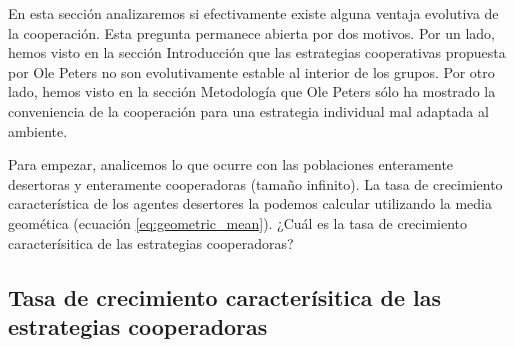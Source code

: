 \documentclass[a4paper,10pt]{article}
\begin{document}
En esta sección analizaremos si efectivamente existe alguna ventaja evolutiva de la cooperación.
Esta pregunta permanece abierta por dos motivos.
Por un lado, hemos visto en la sección Introducción que las estrategias cooperativas propuesta por Ole Peters no son evolutivamente estable al interior de los grupos.
Por otro lado, hemos visto en la sección Metodología que Ole Peters sólo ha mostrado la conveniencia de la cooperación para una estrategia individual mal adaptada al ambiente.


Para empezar, analicemos lo que ocurre con las poblaciones enteramente desertoras y enteramente cooperadoras (tamaño infinito).
La tasa de crecimiento característica de los agentes desertores la podemos calcular utilizando la media geomética (ecuación \ref{eq:geometric_mean}).
¿Cuál es la tasa de crecimiento caracterísitica de las estrategias cooperadoras?

\subsection{Tasa de crecimiento caracterísitica de las estrategias cooperadoras}
\end{document}
